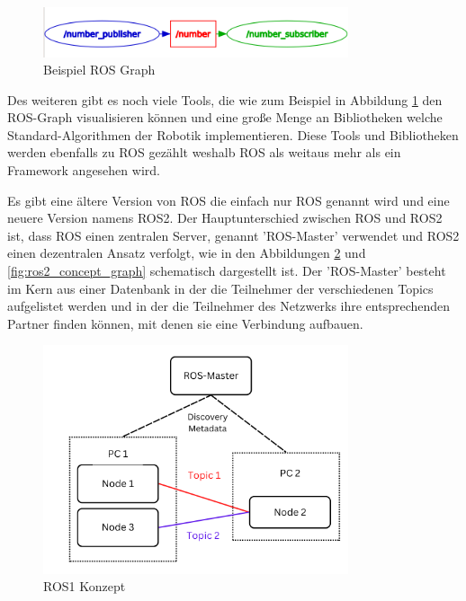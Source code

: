 \begin{flushleft}
\begin{description}
        \begin{figure}[h!]
            \centering
            \includegraphics[width=0.8\textwidth]{imgs/Grundbegriffe/graph_2_nodes_with_topic.png}
            \caption{Beispiel ROS Graph}
            \label{fig:ros_graph}%
        \end{figure}

        Des weiteren gibt es noch viele Tools, die wie zum Beispiel in Abbildung \ref{fig:ros_graph} den ROS-Graph visualisieren können und eine große Menge an Bibliotheken welche Standard-Algorithmen der Robotik implementieren.
        Diese Tools und Bibliotheken werden ebenfalls zu ROS gezählt weshalb ROS als weitaus mehr als ein Framework angesehen wird.

        Es gibt eine ältere Version von ROS die einfach nur ROS genannt wird und eine neuere Version namens ROS2.
        Der Hauptunterschied zwischen ROS und ROS2 ist, dass ROS einen zentralen Server, genannt 'ROS-Master' verwendet und ROS2 einen dezentralen Ansatz verfolgt, wie in den Abbildungen \ref{fig:ros1_concept_graph} und \ref{fig:ros2_concept_graph} schematisch dargestellt ist.
        Der 'ROS-Master' besteht im Kern aus einer Datenbank in der die Teilnehmer der verschiedenen Topics aufgelistet werden und in der die Teilnehmer des Netzwerks ihre entsprechenden Partner finden können, mit denen sie eine Verbindung aufbauen.        
        \begin{figure}[h!]
            \centering
            \includegraphics[width=0.8\textwidth]{imgs/ROS1_concept_graph.png}
            \caption{ROS1 Konzept}
            \label{fig:ros1_concept_graph}%
        \end{figure}


\end{description}
\end{flushleft}
